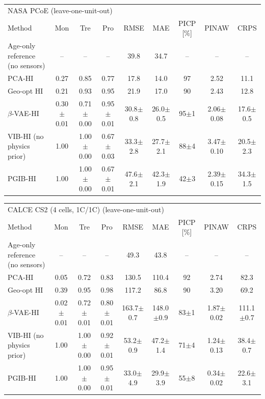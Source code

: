 \begin{tabular}{l c c c c c c c c}
\hline
\multicolumn{9}{l}{NASA PCoE (leave-one-unit-out)}\\
 Method & Mon & Tre & Pro & RMSE & MAE & PICP [\%] & PINAW & CRPS \\
\hline
Age-only reference (no sensors) & -- & -- & -- & 39.8 & 34.7 & -- & -- & -- \\
PCA-HI & 0.27 & 0.85 & 0.77 & 17.8 & 14.0 & 97 & 2.52 & 11.1 \\
Geo-opt HI & 0.21 & 0.93 & 0.95 & 21.9 & 17.0 & 90 & 2.43 & 12.8 \\
$\beta$-VAE-HI & 0.30$\pm$0.01 & 0.71$\pm$0.00 & 0.95$\pm$0.01 & 30.8$\pm$0.8 & 26.0$\pm$0.5 & 95$\pm$1 & 2.06$\pm$0.08 & 17.6$\pm$0.5 \\
VIB-HI (no physics prior) & 1.00 & 1.00$\pm$0.00 & 0.67$\pm$0.03 & 33.3$\pm$2.8 & 27.7$\pm$2.1 & 88$\pm$4 & 3.47$\pm$0.10 & 20.5$\pm$2.3 \\
PGIB-HI & 1.00 & 1.00$\pm$0.00 & 0.67$\pm$0.01 & 47.6$\pm$2.1 & 42.3$\pm$1.9 & 42$\pm$3 & 2.39$\pm$0.15 & 34.3$\pm$1.5 \\
\hline
\end{tabular}
\begin{tabular}{l c c c c c c c c}
\hline
\multicolumn{9}{l}{CALCE CS2 (4 cells, 1C/1C) (leave-one-unit-out)}\\
 Method & Mon & Tre & Pro & RMSE & MAE & PICP [\%] & PINAW & CRPS \\
\hline
Age-only reference (no sensors) & -- & -- & -- & 49.3 & 43.8 & -- & -- & -- \\
PCA-HI & 0.05 & 0.72 & 0.83 & 130.5 & 110.4 & 92 & 2.74 & 82.3 \\
Geo-opt HI & 0.39 & 0.95 & 0.98 & 117.2 & 86.8 & 90 & 3.20 & 69.2 \\
$\beta$-VAE-HI & 0.02$\pm$0.01 & 0.72$\pm$0.01 & 0.80$\pm$0.01 & 163.7$\pm$0.7 & 148.0$\pm$0.9 & 83$\pm$1 & 1.87$\pm$0.02 & 111.1$\pm$0.7 \\
VIB-HI (no physics prior) & 1.00 & 1.00$\pm$0.00 & 0.92$\pm$0.01 & 53.2$\pm$0.9 & 47.2$\pm$1.4 & 71$\pm$4 & 1.24$\pm$0.13 & 38.4$\pm$0.7 \\
PGIB-HI & 1.00 & 1.00$\pm$0.00 & 0.95$\pm$0.01 & 33.0$\pm$4.9 & 29.9$\pm$3.9 & 55$\pm$8 & 0.34$\pm$0.02 & 22.6$\pm$3.1 \\
\hline
\end{tabular}
